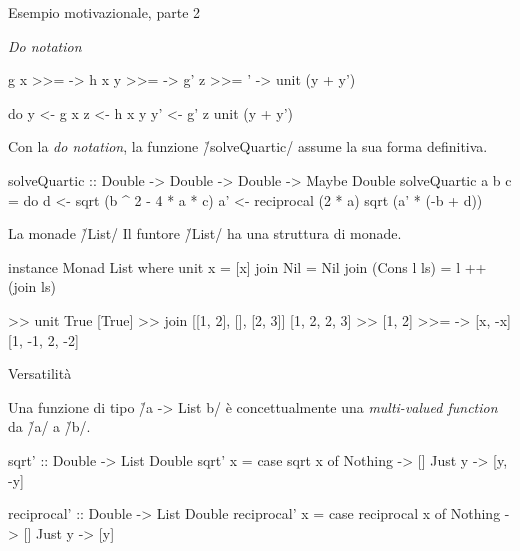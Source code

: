 \begin{frame}[fragile]{\secname}{Esempio motivazionale, parte 2}
\begin{block}{\emph{Do notation}}
\begin{minipage}[t]{0.48\textwidth}
\vspace{-0.3cm}
\begin{haskellcode}
    g x   >>= \y  ->
    h x y >>= \z  ->
    g' z  >>= \y' ->
    unit (y + y')
\end{haskellcode}
\end{minipage}
\hfill\pause
\begin{minipage}[t]{0.48\textwidth}
\vspace{-0.3cm}
\begin{haskellcode}
do  y  <- g x
    z  <- h x y
    y' <- g' z
    unit (y + y')
\end{haskellcode}
\end{minipage}
\end{block}
\pause

Con la \emph{do notation}, la funzione \h/solveQuartic/ assume la sua forma definitiva.
\pause

\begin{haskellcode}
solveQuartic
    :: Double -> Double -> Double -> Maybe Double
solveQuartic a b c = do
    d  <- sqrt (b ^ 2 - 4 * a * c)
    a' <- reciprocal (2 * a)
    sqrt (a' * (-b + d))
\end{haskellcode}
\end{frame}

\begin{frame}[fragile]{\secname}{La monade \h/List/}
Il funtore \h/List/ ha una struttura di monade.
\pause

\begin{haskellcode}
instance Monad List where
    unit x = [x]
    join Nil = Nil
    join (Cons l ls) = l ++ (join ls)
\end{haskellcode}
\pause

\begin{runhaskell}
>>  unit True
    [True]
>>  join [[1, 2], [], [2, 3]]
    [1, 2, 2, 3]
>>  [1, 2] >>= \x -> [x, -x]
    [1, -1, 2, -2]
\end{runhaskell}
\end{frame}

\begin{frame}[fragile]{\secname}{Versatilità}

Una funzione di tipo \h/a -> List b/ è concettualmente una \emph{multi-valued function} da \h/a/ a \h/b/.
\pause

\begin{haskellcode}
sqrt' :: Double -> List Double
sqrt' x = case sqrt x of
    Nothing -> []
    Just y  -> [y, -y]

reciprocal' :: Double -> List Double
reciprocal' x = case reciprocal x of
    Nothing -> []
    Just y  -> [y]
\end{haskellcode}
\end{frame}

